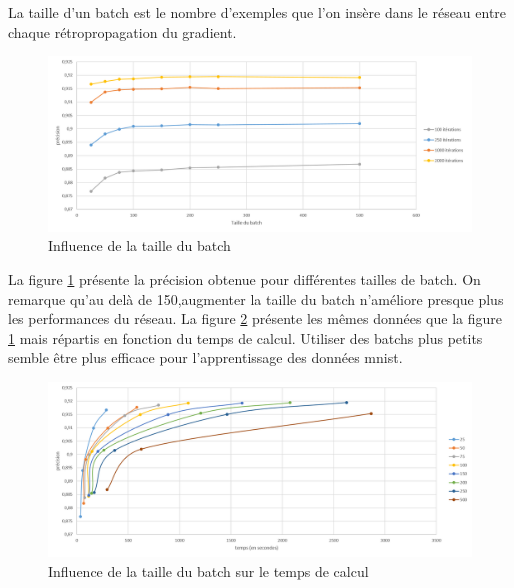 \documentclass{report}
\theoremstyle{plain}
\theoremstyle{definition}
\theoremstyle{remark}
\begin{document}
La taille d'un batch est le nombre d'exemples que l'on insère dans le réseau entre chaque rétropropagation du gradient.

\begin{figure}[!h]
\begin{center}
\includegraphics[scale=0.5]{images/precision_taille_batch.png}
\caption{Influence de la taille du batch}
\label{precision_taille_batch}
\end{center}
\end{figure}

La figure \ref{precision_taille_batch} présente la précision obtenue pour différentes tailles de batch. On remarque qu'au delà de 150,augmenter la taille du batch n'améliore presque plus les performances du réseau.
La figure \ref{precision_batch_temps} présente les mêmes données que la figure \ref{precision_taille_batch} mais répartis en fonction du temps de calcul. Utiliser des batchs plus petits semble être plus efficace pour l'apprentissage des données mnist.

\begin{figure}[!h]
\begin{center}
\includegraphics[scale=0.5]{images/precision_batch_temps.png}
\caption{Influence de la taille du batch sur le temps de calcul}
\label{precision_batch_temps}
\end{center}
\end{figure}
\end{document}
